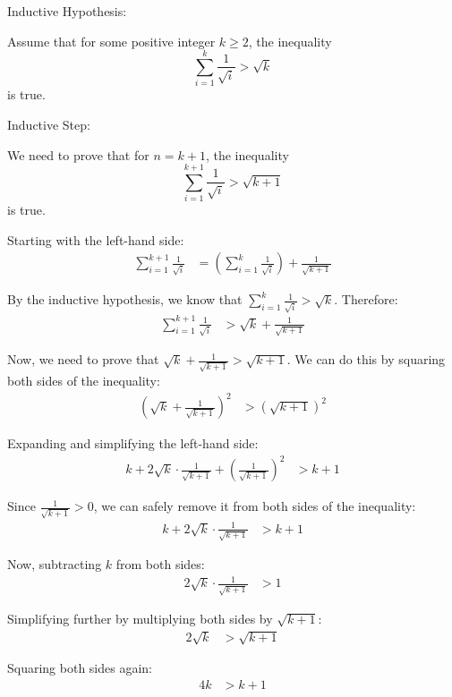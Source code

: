 \documentclass[12pt]{article}
\begin{document}
Inductive Hypothesis:

Assume that for some positive integer \(k \geq 2\), the inequality
\[
\sum_{i=1}^k \frac{1}{\sqrt{i}} > \sqrt{k}
\]
is true.

Inductive Step:

We need to prove that for \(n = k + 1\), the inequality
\[
\sum_{i=1}^{k+1} \frac{1}{\sqrt{i}} > \sqrt{k+1}
\]
is true.

Starting with the left-hand side:
\[
\begin{aligned}
\sum_{i=1}^{k+1} \frac{1}{\sqrt{i}} &= \left(\sum_{i=1}^k \frac{1}{\sqrt{i}}\right) + \frac{1}{\sqrt{k+1}}
\end{aligned}
\]

By the inductive hypothesis, we know that \(\sum_{i=1}^k \frac{1}{\sqrt{i}} > \sqrt{k}\). Therefore:
\[
\begin{aligned}
\sum_{i=1}^{k+1} \frac{1}{\sqrt{i}} &> \sqrt{k} + \frac{1}{\sqrt{k+1}}
\end{aligned}
\]

Now, we need to prove that \(\sqrt{k} + \frac{1}{\sqrt{k+1}} > \sqrt{k+1}\). We can do this by squaring both sides of the inequality:
\[
\begin{aligned}
\left(\sqrt{k} + \frac{1}{\sqrt{k+1}}\right)^2 &> (\sqrt{k+1})^2
\end{aligned}
\]

Expanding and simplifying the left-hand side:
\[
\begin{aligned}
k + 2\sqrt{k}\cdot\frac{1}{\sqrt{k+1}} + \left(\frac{1}{\sqrt{k+1}}\right)^2 &> k+1
\end{aligned}
\]

Since \(\frac{1}{\sqrt{k+1}} > 0\), we can safely remove it from both sides of the inequality:
\[
\begin{aligned}
k + 2\sqrt{k}\cdot\frac{1}{\sqrt{k+1}} &> k+1
\end{aligned}
\]

Now, subtracting \(k\) from both sides:
\[
\begin{aligned}
2\sqrt{k}\cdot\frac{1}{\sqrt{k+1}} &> 1
\end{aligned}
\]

Simplifying further by multiplying both sides by \(\sqrt{k+1}\):
\[
\begin{aligned}
2\sqrt{k} &> \sqrt{k+1}
\end{aligned}
\]

Squaring both sides again:
\[
\begin{aligned}
4k &> k+1
\end{aligned}
\]
\end{document}
